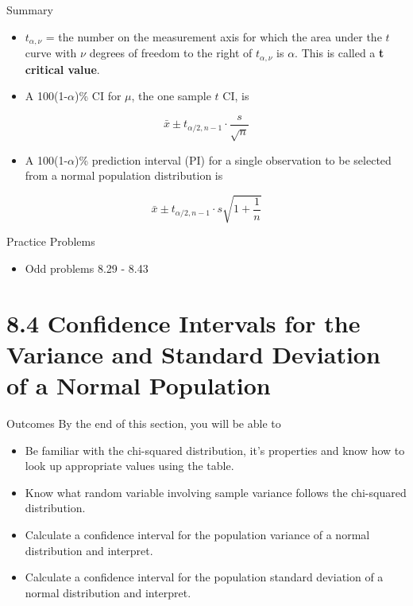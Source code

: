 \documentclass[
  ignorenonframetext,
]{beamer}
\providecommand{\tightlist}{%
  \setlength{\itemsep}{0pt}\setlength{\parskip}{0pt}}\usepackage{longtable,booktabs,array}
\begin{document}
\begin{frame}{Summary}
\protect\hypertarget{summary-5}{}
\begin{itemize}[<+->]
\tightlist
\item
  \(t_{\alpha,\nu}\) = the number on the measurement axis for which the
  area under the \(t\) curve with \(\nu\) degrees of freedom to the
  right of \(t_{\alpha,\nu}\) is \(\alpha\). This is called a \textbf{t
  critical value}.
\item
  A 100(1-\(\alpha\))\% CI for \(\mu\), the one sample \(t\) CI, is
\end{itemize}

\[
\bar{x} \pm t_{\alpha/2,n-1}\cdot \frac{s}{\sqrt{n}}
\]

\begin{itemize}[<+->]
\tightlist
\item
  A 100(1-\(\alpha\))\% prediction interval (PI) for a single
  observation to be selected from a normal population distribution is
\end{itemize}

\[
\bar{x} \pm t_{\alpha/2,n-1}\cdot s\sqrt{1 + \frac{1}{n}}
\]
\end{frame}

\begin{frame}{Practice Problems}
\protect\hypertarget{practice-problems-2}{}
\begin{itemize}[<+->]
\tightlist
\item
  Odd problems 8.29 - 8.43
\end{itemize}
\end{frame}

\hypertarget{confidence-intervals-for-the-variance-and-standard-deviation-of-a-normal-population}{%
\section{8.4 Confidence Intervals for the Variance and Standard
Deviation of a Normal
Population}\label{confidence-intervals-for-the-variance-and-standard-deviation-of-a-normal-population}}

\begin{frame}{Outcomes}
\protect\hypertarget{outcomes-3}{}
By the end of this section, you will be able to

\begin{itemize}[<+->]
\tightlist
\item
  Be familiar with the chi-squared distribution, it's properties and
  know how to look up appropriate values using the table.
\item
  Know what random variable involving sample variance follows the
  chi-squared distribution.
\item
  Calculate a confidence interval for the population variance of a
  normal distribution and interpret.
\item
  Calculate a confidence interval for the population standard deviation
  of a normal distribution and interpret.
\end{itemize}
\end{frame}
\end{document}
